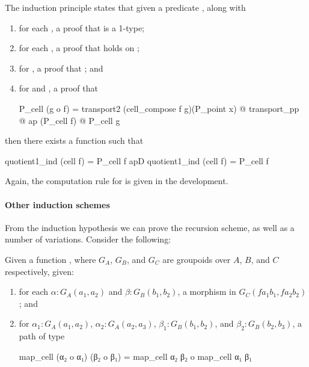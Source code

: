 \documentclass{article}
\begin{document}
The induction principle states that given a predicate 
, along with
\begin{enumerate}
    \item for each , a proof that  is a
      1-type;
    \item for each , a proof  that  holds
      on ;
    \item for , a proof  that
      ; and
    \item for  and , a proof 
       that
    \begin{haskell}
  P_cell (g o f) = transport2 (cell_compose f g)(P_point x)
                 @ transport_pp
                 @ ap (P_cell f)
                 @ P_cell g 
    \end{haskell}
\end{enumerate}
then there exists a function  such that
\begin{haskell}
    quotient1_ind (cell f) = P_cell f
    apD quotient1_ind (cell f) = P_cell f
\end{haskell}
Again, the computation rule for  is given in the
development. 

\paragraph{Other induction schemes}

From the induction hypothesis we can prove the recursion scheme, as well as a
number of variations. Consider the following:

Given a function , where $G_A$, $G_B$, and $G_C$ are
groupoids over $A$, $B$, and $C$ respectively, given:
\begin{enumerate}
    \item for each $α : G_A(a_1,a_2)$ and $β : G_B(b_1,b_2)$, a morphism
         in $G_C (f a_1 b_1, f a_2 b_2)$; and
    \item for $α_1 : G_A(a_1,a_2)$, $α_2 : G_A(a_2,a_3)$, $β_1 : G_B (b_1,b_2)$,
        and $β_2 : G_B (b_2,b_3)$, a path  of
        type
      \begin{haskell}
    map_cell (α₂ o α₁) (β₂ o β₁) = map_cell α₂ β₂ o map_cell α₁ β₁
      \end{haskell}
\end{enumerate}
\end{document}
